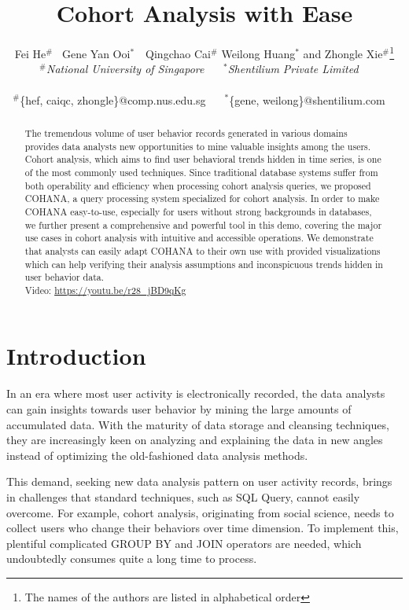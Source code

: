 \documentclass[10pt,conference,letterpaper]{IEEEtran}
\title{Cohort Analysis with Ease}
\author{
{Fei He{\small $^{\#}$} \ Gene Yan Ooi{\small $^{*}$}\ \  Qingchao Cai{\small $^{\#}$} Weilong Huang{\small $^{*}$} and Zhongle Xie{\small $^{\#}$}}\thanks{The names of the authors are listed in alphabetical order}%
\vspace{1.6mm}\\
\fontsize{10}{10}\selectfont\itshape
$^{\#}$National University of Singapore\ \ \
$~^{*}$Shentilium Private Limited\ \ \\
\fontsize{9}{9}\selectfont\ttfamily\upshape

$^{\#}$\{hef, caiqc, zhongle\}@comp.nus.edu.sg\ \ \
$~^{*}$\{gene, weilong\}@shentilium.com\ \ 
\vspace{1.2mm}\\
\fontsize{10}{10}\selectfont\rmfamily\itshape
}
\begin{document}
\maketitle
%
\begin{abstract} 
The tremendous volume of user behavior records generated in various domains provides data analysts new opportunities to mine valuable insights among the users. Cohort analysis, which aims to find user behavioral trends hidden in time series, is one of the most commonly used techniques. Since traditional database systems suffer from both operability and efficiency when processing cohort analysis queries, we proposed COHANA\cite{jiang2016cohort}, a query processing system specialized for cohort analysis. In order to make COHANA easy-to-use, especially for users without strong backgrounds in databases, we further present a comprehensive and powerful tool in this demo, covering the major use cases in cohort analysis with intuitive and accessible operations. We demonstrate that analysts can easily adapt COHANA to their own use with provided visualizations which can help verifying their analysis assumptions and inconspicuous trends hidden in user behavior data.\\


Video: \url{https://youtu.be/r28_jBD9qKg}
\end{abstract}

%
\section{Introduction}
%
In an era where most user activity is electronically recorded, the data analysts can gain insights towards user behavior by mining the large amounts of accumulated data. With the maturity of data storage and cleansing techniques, they are increasingly keen on analyzing and explaining the data in new angles instead of optimizing the old-fashioned data analysis methods.

This demand, seeking new data analysis pattern on user activity records, brings in challenges that standard techniques, such as SQL Query, cannot easily overcome. 
For example, cohort analysis, originating from social science\cite{glenn2005cohort}, needs to collect users who change their behaviors over time dimension.
To implement this, plentiful complicated GROUP BY and JOIN operators are needed, which undoubtedly consumes quite a long time to process.
\end{document}
